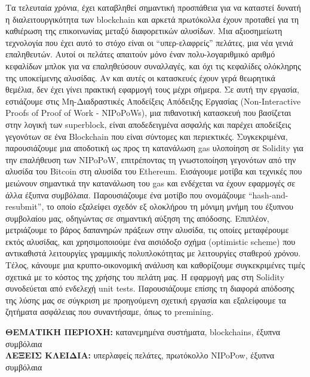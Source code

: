 Τα τελευταία χρόνια, έχει καταβληθεί σημαντική προσπάθεια για να καταστεί
δυνατή η διαλειτουργικότητα των blockchain και αρκετά πρωτόκολλα έχουν προταθεί
για τη καθιέρωση της επικοινωνίας μεταξύ διαφορετικών αλυσίδων. Μια
αξιοσημείωτη τεχνολογία που έχει αυτό το στόχο είναι οι “υπερ-ελαφρείς”
πελάτες, μια νέα γενιά επαληθευτών. Αυτοί οι πελάτες απαιτούν μόνο έναν
πολυ-λογαριθμικό αριθμό κεφαλίδων μπλοκ για να επαληθεύσουν συναλλαγές, και όχι
τις κεφαλίδες ολόκληρης της υποκείμενης αλυσίδας. Αν και αυτές οι κατασκευές
έχουν γερά θεωρητικά θεμέλια, δεν έχει γίνει πρακτική εφαρμογή τους μέχρι
σήμερα. Σε αυτή την εργασία, εστιάζουμε στις Μη-Διαδραστικές Αποδείξεις
Απόδειξης Εργασίας (Non-Interactive Proofs of Proof of Work - NIPoPoWs), μια
πιθανοτική κατασκευή που βασίζεται στην λογική των superblock, είναι
αποδεδειγμένα ασφαλής και παρέχει αποδείξεις γεγονότων σε ένα Blockchain που
είναι σύντομες και περιεκτικές. Συγκεκριμένα, παρουσιάζουμε μια αποδοτική ως
προς τη κατανάλωση gas υλοποίηση σε Solidity για την επαλήθευση των NIPoPoW,
επιτρέποντας τη γνωστοποίηση γεγονότων από την αλυσίδα του Bitcoin στη αλυσίδα
του Ethereum. Εισάγουμε μοτίβα και τεχνικές που μειώνουν σημαντικά την
κατανάλωση του gas και ενδέχεται να έχουν εφαρμογές σε άλλα έξυπνα συμβόλαια.
Παρουσιάζουμε ένα μοτίβο που ονομάζουμε ``hash-and-resubmit'', το οποίο εξαλείφει
σχεδόν εξ ολοκλήρου τη μόνιμη μνήμη του έξυπνου συμβολαίου μας, οδηγώντας σε
σημαντική αύξηση της απόδοσης. Επιπλέον, μετριάζουμε το βάρος δαπανηρών πράξεων
στην αλυσίδα, τις οποίες μεταφέρουμε εκτός αλυσίδας, και χρησιμοποιούμε ένα
αισιόδοξο σχήμα (optimistic scheme) που αντικαθιστά λειτουργίες γραμμικής
πολυπλοκότητας με λειτουργίες σταθερού χρόνου. Τέλος, κάνουμε μια
κρυπτο-οικονομική ανάλυση και καθορίζουμε συγκεκριμένες τιμές σχετικά με το
κόστος της χρήσης του πελάτη μας. Η εφαρμογή μας στη Solidity συνοδεύεται από
ενδελεχή unit tests. Παρουσιάζουμε επίσης τη διαφορά απόδοσης της λύσης μας σε
σύγκριση με προηγούμενη σχετική εργασία και εξαλείφουμε τα ζητήματα ασφάλειας
που συναντήσαμε, όπως το premining.

\vspace{6.5cm}
\noindent
\textbf{ΘΕΜΑΤΙΚΗ ΠΕΡΙΟΧΗ:} κατανεμημένα συστήματα, blockchains, έξυπνα
συμβόλαια\\
\textbf{ΛΕΞΕΙΣ ΚΛΕΙΔΙΑ:} υπερλαφείς πελάτες, πρωτόκολλο NIPoPow, έξυπνα
συμβόλαια

